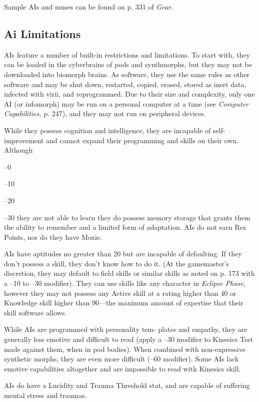 Sample AIs and muses can be found on p. 331 of \textit{Gear.}

\subsection{Ai Limitations}

AIs feature a number of built-in restrictions and 
limitations. To start with, they can be loaded in the 
cyberbrains of pods and synthmorphs, but they may 
not be downloaded into biomorph brains. As software, 
they use the same rules as other software and may be 
shut down, restarted, copied, erased, stored as inert 
data, infected with virii, and reprogrammed. Due to 
their size and complexity, only one AI (or infomorph) 
may be run on a personal computer at a time (see 
\textit{Computer Capabilities,} p. 247), and they may not run 
on peripheral devices.

While they possess cognition and intelligence, they 
are incapable of self-improvement and cannot expand 
their programming and skills on their own. Although 

–0

–10

–20

–30
they are not able to learn they do possess memory 
storage that grants them the ability to remember and 
a limited form of adaptation. AIs do not earn Rez 
Points, nor do they have Moxie.

AIs have aptitudes no greater than 20 but are 
incapable of defaulting. If they don't possess a skill, 
they don't know how to do it. (At the gamemaster's 
discretion, they may default to field skills or similar 
skills as noted on p. 173 with a –10 to –30 modifier). 
They can use skills like any character in \textit{Eclipse Phase}, 
however they may not possess any Active skill at a 
rating higher than 40 or Knowledge skill higher than 
90—the maximum amount of expertise that their skill 
software allows.

While AIs are programmed with personality tem-
plates and empathy, they are generally less emotive 
and difficult to read (apply a –30 modifier to Kinesics 
Test made against them, when in pod bodies). When 
combined with non-expressive synthetic morphs, they 
are even more difficult (–60 modifier). Some AIs lack 
emotive capabilities altogether and are impossible to 
read with Kinesics skill.

AIs do have a Lucidity and Trauma Threshold stat, 
and are capable of suffering mental stress and traumas.

